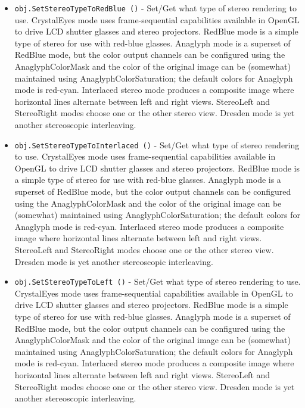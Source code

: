 \begin{itemize}
\item  \verb|obj.SetStereoTypeToRedBlue ()| -  Set/Get what type of stereo rendering to use.  CrystalEyes
 mode uses frame-sequential capabilities available in OpenGL
 to drive LCD shutter glasses and stereo projectors.  RedBlue
 mode is a simple type of stereo for use with red-blue glasses.
 Anaglyph mode is a superset of RedBlue mode, but the color
 output channels can be configured using the AnaglyphColorMask
 and the color of the original image can be (somewhat) maintained
 using AnaglyphColorSaturation;  the default colors for Anaglyph
 mode is red-cyan.  Interlaced stereo mode produces a composite
 image where horizontal lines alternate between left and right
 views.  StereoLeft and StereoRight modes choose one or the other
 stereo view.  Dresden mode is yet another stereoscopic
 interleaving.

\item  \verb|obj.SetStereoTypeToInterlaced ()| -  Set/Get what type of stereo rendering to use.  CrystalEyes
 mode uses frame-sequential capabilities available in OpenGL
 to drive LCD shutter glasses and stereo projectors.  RedBlue
 mode is a simple type of stereo for use with red-blue glasses.
 Anaglyph mode is a superset of RedBlue mode, but the color
 output channels can be configured using the AnaglyphColorMask
 and the color of the original image can be (somewhat) maintained
 using AnaglyphColorSaturation;  the default colors for Anaglyph
 mode is red-cyan.  Interlaced stereo mode produces a composite
 image where horizontal lines alternate between left and right
 views.  StereoLeft and StereoRight modes choose one or the other
 stereo view.  Dresden mode is yet another stereoscopic
 interleaving.

\item  \verb|obj.SetStereoTypeToLeft ()| -  Set/Get what type of stereo rendering to use.  CrystalEyes
 mode uses frame-sequential capabilities available in OpenGL
 to drive LCD shutter glasses and stereo projectors.  RedBlue
 mode is a simple type of stereo for use with red-blue glasses.
 Anaglyph mode is a superset of RedBlue mode, but the color
 output channels can be configured using the AnaglyphColorMask
 and the color of the original image can be (somewhat) maintained
 using AnaglyphColorSaturation;  the default colors for Anaglyph
 mode is red-cyan.  Interlaced stereo mode produces a composite
 image where horizontal lines alternate between left and right
 views.  StereoLeft and StereoRight modes choose one or the other
 stereo view.  Dresden mode is yet another stereoscopic
 interleaving.


\end{itemize}
